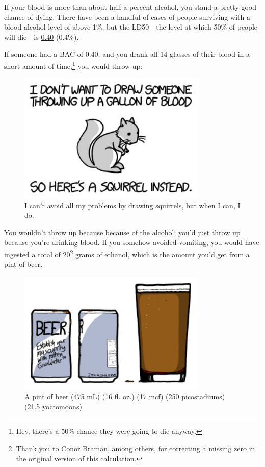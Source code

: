 {{If your blood is more than about half a percent alcohol, you stand a pretty good chance of dying. There have been a handful of cases of people surviving with a blood alcohol level of above 1\%, but the LD50—the level at which 50\% of people will die—is \href{http://www.nellis.af.mil/shared/media/document/AFD-110211-015.pdf}{0.40} (0.4\%).}

{If someone had a BAC of 0.40, and you drank all 14 glasses of their blood in a short amount of time,{\footnote{Hey, there's a 50\% chance they were going to die anyway.} } you would throw up:}

\begin{figure}[!htbp]
\centering
\includegraphics[scale=0.5, max width=0.8\textwidth]{imgs/a/98/squirrel.png}
\caption{I can't avoid all my problems by drawing squirrels, but when I can, I do.}
\end{figure}

{You wouldn't throw up because because of the alcohol; you'd just throw up because you're drinking blood. If you somehow avoided vomiting, you would have ingested a total of 20{\footnote{Thank you to Conor Braman, among others, for correcting a missing zero in the original version of this calculation.} } grams of ethanol, which is the amount you'd get from a pint of beer.}

\begin{figure}[!htbp]
\centering
\includegraphics[scale=0.5, max width=0.8\textwidth]{imgs/a/98/beer.png}
\caption{A pint of beer (475 mL) (16 fl. oz.) (17 mcf) (250 picostadiums) (21.5 yoctomoons)}
\end{figure}

}
